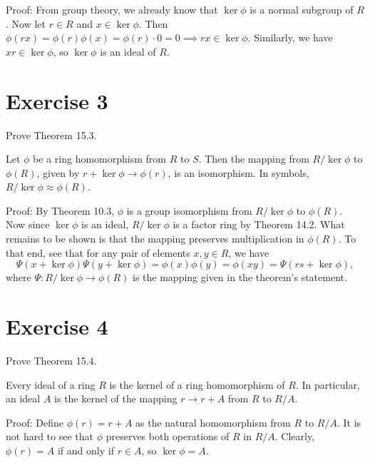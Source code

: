 \documentclass[12pt]{article}
\begin{document}
Proof: From group theory, we already know that $\ker\phi$ is
a normal subgroup of $R$.  Now let $r\in R$ and $x\in\ker\phi$.
Then $\phi(rx)=\phi(r)\phi(x)=\phi(r)\cdot 0=0\implies rx\in\ker\phi$.
Similarly, we have $xr\in\ker\phi$, so $\ker\phi$ is an ideal of $R$.

\section*{Exercise 3}

Prove Theorem 15.3.

Let $\phi$ be a ring homomorphism from $R$ to $S$.  Then the
mapping from $R/\ker\phi$ to $\phi(R)$, given by $r+\ker\phi\to\phi(r)$,
is an isomorphism.  In symbols, $R/\ker\phi\approx\phi(R)$.

Proof: By Theorem 10.3, $\phi$ is a group isomorphism from $R/\ker\phi$
to $\phi(R)$.  Now since $\ker\phi$ is an ideal, $R/\ker\phi$ is a factor ring
by Theorem 14.2.  What remains to be shown is that the mapping preserves
multiplication in $\phi(R)$.  To that end, see that for any pair of elements $x,y\in R$, we have
\begin{equation*}
\Psi(x+\ker\phi)\Psi(y+\ker\phi)=\phi(x)\phi(y)=\phi(xy)=\Psi(rs+\ker\phi),
\end{equation*}
where $\Psi:R/\ker\phi\to\phi(R)$ is the mapping given in the theorem's statement.

\section*{Exercise 4}

Prove Theorem 15.4.

Every ideal of a ring $R$ is the kernel of a ring homomorphism of $R$.
In particular, an ideal $A$ is the kernel of the mapping $r\to r+A$ from
$R$ to $R/A$.

Proof: Define $\phi(r)=r+A$ as the natural homomorphism from $R$ to $R/A$.
It is not hard to see that $\phi$ preserves both operations of $R$ in $R/A$.
Clearly, $\phi(r)=A$ if and only if $r\in A$, so $\ker\phi=A$.
\end{document}
